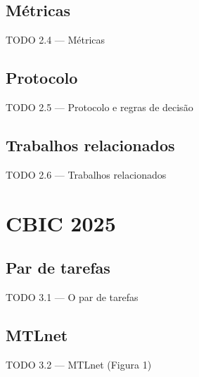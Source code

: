 \documentclass{beamer}
\begin{document}
\subsection{Métricas}
\begin{frame}{TODO 2.4 --- Métricas}
\end{frame}

\subsection{Protocolo}
\begin{frame}{TODO 2.5 --- Protocolo e regras de decisão}
\end{frame}

\subsection{Trabalhos relacionados}
\begin{frame}{TODO 2.6 --- Trabalhos relacionados}
\end{frame}

\section{CBIC 2025}

\subsection{Par de tarefas}
\begin{frame}{TODO 3.1 --- O par de tarefas}
\end{frame}

\subsection{MTLnet}
\begin{frame}{TODO 3.2 --- MTLnet (Figura 1)}
\end{frame}
\end{document}
